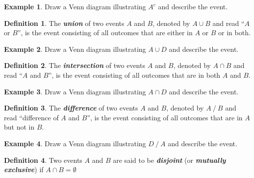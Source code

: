 \documentclass[
]{book}
\theoremstyle{definition}
\newtheorem{definition}{Definition}[chapter]
\theoremstyle{definition}
\newtheorem{example}{Example}[chapter]
\theoremstyle{definition}
\theoremstyle{definition}
\theoremstyle{remark}
\begin{document}
\begin{example}
Draw a Venn diagram illustrating \(A^c\) and describe the event.
\end{example}

\hfill\break
\hfill\break
\hfill\break
\hfill\break
\hfill\break

\begin{definition}
The \textbf{\emph{union}} of two events \(A\) and \(B\), denoted by \(A \cup B\) and read ``\(A\) or \(B\)'', is the event consisting of all outcomes that are either in \(A\) or \(B\) or in both.
\end{definition}

\begin{example}
Draw a Venn diagram illustrating \(A \cup D\) and describe the event.
\end{example}

\hfill\break
\hfill\break
\hfill\break
\hfill\break
\hfill\break

\begin{definition}
The \textbf{\emph{intersection}} of two events \(A\) and \(B\), denoted by \(A \cap B\) and read ``\(A\) and \(B\)'', is the event consisting of all outcomes that are in both \(A\) and \(B\).
\end{definition}

\begin{example}
Draw a Venn diagram illustrating \(A \cap D\) and describe the event.
\end{example}

\hfill\break
\hfill\break
\hfill\break
\hfill\break
\hfill\break

\begin{definition}
The \textbf{\emph{difference}} of two events \(A\) and \(B\), denoted by \(A \mathbin{/} B\) and read ``difference of \(A\) and \(B\)'', is
the event consisting of all outcomes that are in \(A\) but not in \(B\).
\end{definition}

\begin{example}
Draw a Venn diagram illustrating \(D \mathbin{/} A\) and describe the event.
\end{example}

\hfill\break
\hfill\break
\hfill\break
\hfill\break
\hfill\break

\begin{definition}
Two events \(A\) and \(B\) are said to be \textbf{\emph{disjoint}} (or \textbf{\emph{mutually exclusive}}) if \(A \cap B = \emptyset\)
\end{definition}
\end{document}

